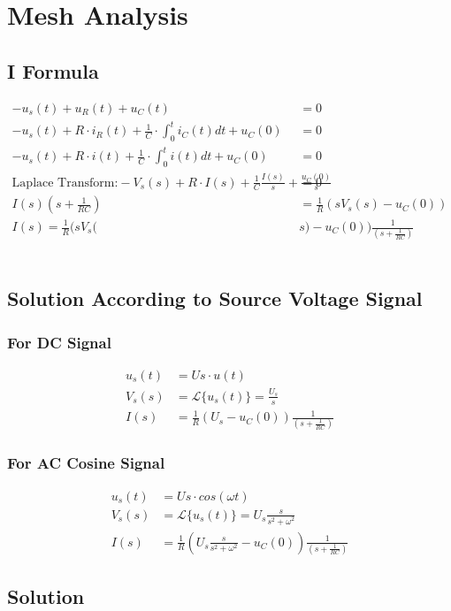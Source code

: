 \documentclass{article}
\begin{document}
\section{Mesh Analysis}
\subsection{I Formula}
\begin{align*}
    -u_s(t)+u_R(t)+u_C(t)&=0 \\
    -u_s(t)+R \cdot i_R(t) + \frac{1}{C}\cdot \int_{0}^{t}i_C(t)dt +u_C(0) &=0 \\
    -u_s(t)+R \cdot i(t) + \frac{1}{C}\cdot \int_{0}^{t}i(t)dt +u_C(0) &=0\\
    \text{Laplace Transform:}     -V_s(s)+R \cdot I(s) + \frac{1}{C} \frac{I(s)}{s} +\frac{u_C(0)}{s} &=0\\
    I(s) (s+ \frac{1}{RC}) &= \frac{1}{R} (s V_s(s) - u_C(0)) \\
    I(s) = \frac{1}{R} (s V_s(&s) - u_C(0))\frac{1}{(s+ \frac{1}{RC})}
\end{align*}\\

\subsection{Solution According to Source Voltage Signal}
\subsubsection{For DC Signal}
\begin{align*}
    u_s(t) &= Us \cdot u(t)\\
    V_s(s) &= \mathcal{L} \big\{u_s(t)\big\} = \frac{U_s}{s}\\
    I(s) &= \frac{1}{R} (U_s - u_C(0))\frac{1}{(s+ \frac{1}{RC})}
\end{align*}
\subsubsection{For AC Cosine Signal}
\begin{align*}
    u_s(t) &= Us \cdot cos(\omega t)\\
    V_s(s) &= \mathcal{L} \big\{u_s(t)\big\} =U_s \frac{s}{s^2+\omega^2}\\
    I(s) &= \frac{1}{R} (U_s \frac{s}{s^2+\omega^2} - u_C(0))\frac{1}{(s+ \frac{1}{RC})}
\end{align*}
\subsection{Solution}
\end{document}
